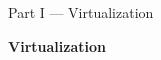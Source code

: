 \begin{frame}{Part I --- Virtualization}

\begin{center}
    \Huge
    \textbf{Virtualization}
\end{center}

\end{frame}
